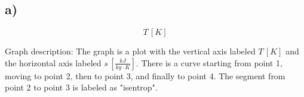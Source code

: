 

\subsection*{a)}

\[
T \, [K]
\]

Graph description: The graph is a plot with the vertical axis labeled \( T \, [K] \) and the horizontal axis labeled \( s \, \left[ \frac{kJ}{kg \cdot K} \right] \). There is a curve starting from point 1, moving to point 2, then to point 3, and finally to point 4. The segment from point 2 to point 3 is labeled as "isentrop".